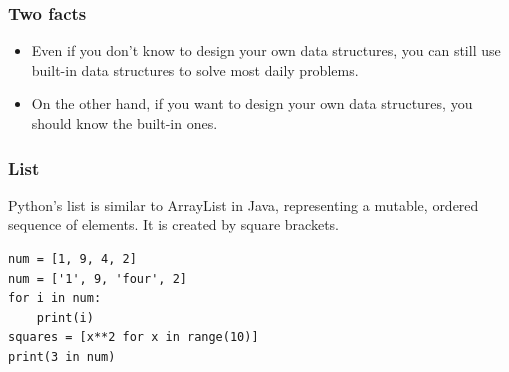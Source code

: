 \documentclass[aspectratio=169, 14pt]{beamer}
\begin{document}
\begin{frame}[fragile]
	\frametitle{Two facts}
	\begin{itemize}
		\item Even if you don't know to design your own data structures, you can still use built-in data structures to solve most daily problems.
		\item On the other hand, if you want to design your own data structures, you should know the built-in ones.
	\end{itemize}

\end{frame}

\begin{frame}[fragile]
	\frametitle{List}
	Python's \alert{list} is similar to \alert{ArrayList} in Java, representing a mutable, ordered sequence of elements. It is created by square brackets.

	\begin{verbatim}
num = [1, 9, 4, 2]        
num = ['1', 9, 'four', 2]
for i in num:
    print(i)
squares = [x**2 for x in range(10)]
print(3 in num)
    \end{verbatim}
\end{frame}
\end{document}
